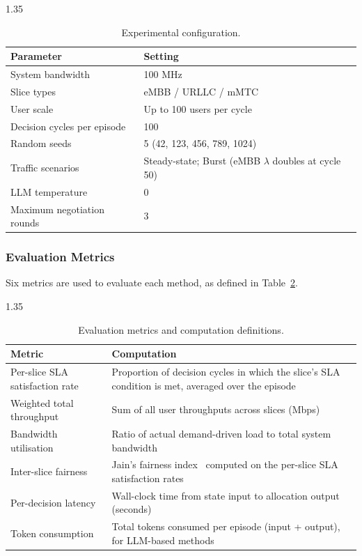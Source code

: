 \begin{table}[h]
  \centering
  \begin{spacing}{1.35}
  \caption{Experimental configuration.}\vspace{0.7em}
  \label{table:expconfig}
    \begin{tabular}{|p{5.5cm}|p{8cm}|}
    \hline
    \textbf{Parameter} & \textbf{Setting} \\
    \hline
    System bandwidth & 100 MHz \\
    \hline
    Slice types & eMBB / URLLC / mMTC \\
    \hline
    User scale & Up to 100 users per cycle \\
    \hline
    Decision cycles per episode & 100 \\
    \hline
    Random seeds & 5 (42, 123, 456, 789, 1024) \\
    \hline
    Traffic scenarios & Steady-state; Burst (eMBB $\lambda$ doubles at cycle 50) \\
    \hline
    LLM temperature & 0 \\
    \hline
    Maximum negotiation rounds & 3 \\
    \hline
    \end{tabular}
  \end{spacing}
\end{table}

\subsubsection{Evaluation Metrics}

Six metrics are used to evaluate each method, as defined in Table~\ref{table:metrics}.

\begin{table}[h]
  \centering
  \begin{spacing}{1.35}
  \caption{Evaluation metrics and computation definitions.}\vspace{0.7em}
  \label{table:metrics}
    \begin{tabular}{|p{4cm}|p{9.5cm}|}
    \hline
    \textbf{Metric} & \textbf{Computation} \\
    \hline
    Per-slice SLA satisfaction rate & Proportion of decision cycles in which the slice's SLA condition is met, averaged over the episode \\
    \hline
    Weighted total throughput & Sum of all user throughputs across slices (Mbps) \\
    \hline
    Bandwidth utilisation & Ratio of actual demand-driven load to total system bandwidth \\
    \hline
    Inter-slice fairness & Jain's fairness index~\cite{jain1984fairness} computed on the per-slice SLA satisfaction rates \\
    \hline
    Per-decision latency & Wall-clock time from state input to allocation output (seconds) \\
    \hline
    Token consumption & Total tokens consumed per episode (input + output), for LLM-based methods \\
    \hline
    \end{tabular}
  \end{spacing}
\end{table}


